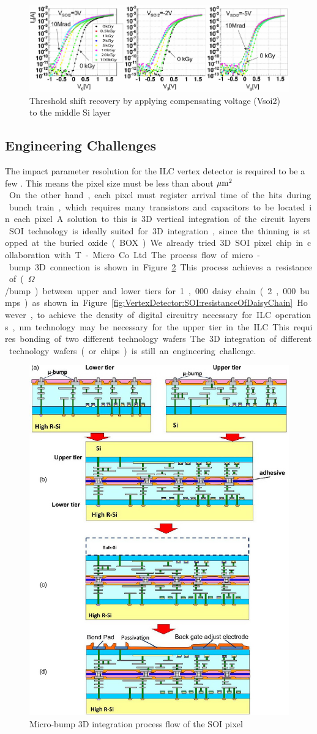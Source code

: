 \begin{figure}
\centering
\includegraphics[width=.5\textwidth]{VertexDetector/SOI/thresholdShift}
\caption{Threshold shift recovery by applying compensating voltage (Vsoi2) to the middle Si layer}
\label{fig:VertexDetector:SOI:thresholdShift}
\end{figure}

\subsection{Engineering Challenges}
The impact parameter resolution for the ILC vertex detector is required to be a few \micron. This means the pixel size must be less than about \unit[20]{$\mu\mathrm{m}^2$}. On the other hand, each pixel must register arrival time of the hits during bunch train, which requires many transistors and capacitors to be located in each pixel.
A solution to this is 3D vertical integration of the circuit layers. SOI technology is ideally suited for 3D integration, since the thinning is stopped at the buried oxide (BOX). We already tried 3D SOI pixel chip in collaboration with T-Micro Co. Ltd. The process flow of micro-bump 3D connection is shown in Figure~\ref{fig:VertexDetector:SOI:microbump3D}. This process achieves a resistance of (~\unit[6]{$\Omega$}/bump) between upper and lower tiers for 1,000 daisy chain (2,000 bumps) as shown in Figure~\ref{fig:VertexDetector:SOI:resistanceOfDaisyChain}.
However, to achieve the density of digital circuitry necessary for ILC operations, \unit[32]{nm} technology may be necessary for the upper tier in the ILC. This requires bonding of two different technology wafers. The 3D integration of different technology wafers (or chips) is still an engineering challenge.

\begin{figure}
\centering
\includegraphics[width=.5\textwidth]{VertexDetector/SOI/microBump3DIntegration}
\caption{Micro-bump 3D integration process flow of the SOI pixel}
\label{fig:VertexDetector:SOI:microbump3D}
\end{figure}

